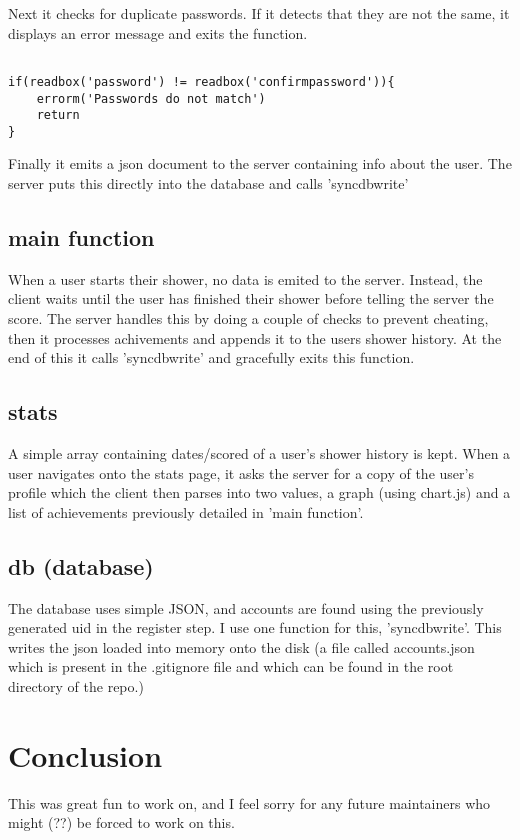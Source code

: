 \documentclass{article}
\begin{document}
Next it checks for duplicate passwords. If it detects that they are not the same, it displays an error message and exits the function.

\begin{minipage}{\linewidth}
\begin{lstlisting}

if(readbox('password') != readbox('confirmpassword')){
    errorm('Passwords do not match')
    return
}
\end{lstlisting}
\end{minipage}

Finally it emits a json document to the server containing info about the user. The server puts this directly into the database and calls 'syncdbwrite'

\subsection{main function}
When a user starts their shower, no data is emited to the server. Instead, the client waits until the user has finished their shower before telling the server the score.
The server handles this by doing a couple of checks to prevent cheating, then it processes achivements and appends it to the users shower history. At the end of this it calls 'syncdbwrite' and gracefully exits this function.

\subsection{stats}

A simple array containing dates/scored of a user's shower history is kept. When a user navigates onto the stats page, it asks the server for a copy of the user's profile which the client then parses into two values, a graph (using chart.js) and a list of achievements previously detailed in 'main function'.

\subsection{db (database)}

The database uses simple JSON, and accounts are found using the previously generated uid in the register step. I use one function for this, 'syncdbwrite'. This writes the json loaded into memory onto the disk (a file called accounts.json which is present in the .gitignore file and which can be found in the root directory of the repo.)

\section{Conclusion}

This was great fun to work on, and I feel sorry for any future maintainers who might (??) be forced to work on this.
\end{document}
